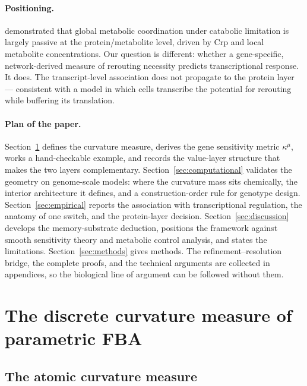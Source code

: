 \documentclass[11pt,a4paper]{article}
\theoremstyle{plain}
\theoremstyle{definition}
\theoremstyle{remark}
\newcommand{\kmu}{\kappa^{\mu}}
\begin{document}
\paragraph{Positioning.}
\citet{kochanowski2013} demonstrated that global metabolic coordination under
catabolic limitation is largely passive at the protein/metabolite level,
driven by Crp and local metabolite concentrations. Our question is different: whether a gene-specific, network-derived
measure of rerouting necessity predicts transcriptional response. It
does. The transcript-level association does not
propagate to the protein layer --- consistent with a model in
which cells transcribe the potential for rerouting while buffering
its translation.

\paragraph{Plan of the paper.}
Section~\ref{sec:measure} defines the curvature measure, derives the
gene sensitivity metric $\kmu$, works a hand-checkable example, and
records the value-layer structure that makes the two layers
complementary. Section~\ref{sec:computational} validates the geometry
on genome-scale models: where the curvature mass sits chemically, the
interior architecture it defines, and a construction-order rule for
genotype design. Section~\ref{sec:empirical} reports the association
with transcriptional regulation, the anatomy of one switch, and the
protein-layer decision. Section~\ref{sec:discussion} develops the
memory-substrate deduction, positions the framework against smooth
sensitivity theory and metabolic control analysis, and states the
limitations. Section~\ref{sec:methods} gives methods. The
refinement--resolution bridge, the complete proofs, and the technical
arguments are collected in appendices, so the biological line of
argument can be followed without them.

\section{The discrete curvature measure of parametric FBA}
\label{sec:measure}



\subsection{The atomic curvature measure}
\end{document}
